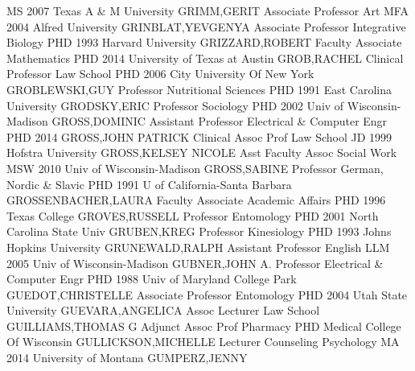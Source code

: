 \documentclass[
]{article}
\begin{document}
\textbar MS 2007 Texas A \& M University \textbar{} 
\textbar GRIMM,GERIT \textbar Associate Professor \textbar Art
\textbar MFA 2004 Alfred University \textbar{} 
\textbar GRINBLAT,YEVGENYA \textbar Associate Professor
\textbar Integrative Biology \textbar PHD 1993 Harvard University
\textbar{}  \textbar GRIZZARD,ROBERT \textbar Faculty
Associate \textbar Mathematics \textbar PHD 2014 University of Texas at
Austin \textbar{}  \textbar GROB,RACHEL \textbar Clinical
Professor \textbar Law School \textbar PHD 2006 City University Of New
York \textbar{}  \textbar GROBLEWSKI,GUY \textbar Professor
\textbar Nutritional Sciences \textbar PHD 1991 East Carolina University
\textbar{}  \textbar GRODSKY,ERIC \textbar Professor
\textbar Sociology \textbar PHD 2002 Univ of Wisconsin-Madison
\textbar{}  \textbar GROSS,DOMINIC \textbar Assistant
Professor \textbar Electrical \& Computer Engr \textbar PHD 2014
\textbar{}  \textbar GROSS,JOHN PATRICK \textbar Clinical
Assoc Prof \textbar Law School \textbar JD 1999 Hofstra University
\textbar{}  \textbar GROSS,KELSEY NICOLE \textbar Asst
Faculty Assoc \textbar Social Work \textbar MSW 2010 Univ of
Wisconsin-Madison \textbar{}  \textbar GROSS,SABINE
\textbar Professor \textbar German, Nordic \& Slavic \textbar PHD 1991 U
of California-Santa Barbara \textbar{} 
\textbar GROSSENBACHER,LAURA \textbar Faculty Associate
\textbar Academic Affairs \textbar PHD 1996 Texas College \textbar{}
 \textbar GROVES,RUSSELL \textbar Professor
\textbar Entomology \textbar PHD 2001 North Carolina State Univ
\textbar{}  \textbar GRUBEN,KREG \textbar Professor
\textbar Kinesiology \textbar PHD 1993 Johns Hopkins University
\textbar{}  \textbar GRUNEWALD,RALPH \textbar Assistant
Professor \textbar English \textbar LLM 2005 Univ of Wisconsin-Madison
\textbar{}  \textbar GUBNER,JOHN A. \textbar Professor
\textbar Electrical \& Computer Engr \textbar PHD 1988 Univ of Maryland
College Park \textbar{}  \textbar GUEDOT,CHRISTELLE
\textbar Associate Professor \textbar Entomology \textbar PHD 2004 Utah
State University \textbar{}  \textbar GUEVARA,ANGELICA
\textbar Assoc Lecturer \textbar Law School \textbar GUILLIAMS,THOMAS G
\textbar{}  \textbar Adjunct Assoc Prof \textbar Pharmacy
\textbar PHD Medical College Of Wisconsin \textbar GULLICKSON,MICHELLE
\textbar{}  \textbar Lecturer \textbar Counseling Psychology
\textbar MA 2014 University of Montana \textbar GUMPERZ,JENNY \textbar{}
\end{document}
